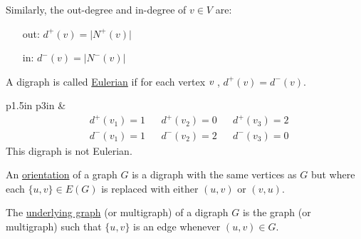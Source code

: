 \documentclass{book}
\newcommand{\exOne}{%
   \color{Purple}%
   \fontsize{14}{16}\selectfont%
}
\newenvironment{myIndent}{%
   \begin{adjustwidth}{2.5em}{0em}%
}{%
   \end{adjustwidth}%
}
\newcommand{\udefine}[1]{{%
   \setulcolor{Red}%
   \setul{0.14em}{0.07em}%
   \ul{#1}%
}}
\newcommand{\retTwo}{\hfill\bigbreak}
\begin{document}
Similarly, the out-degree and in-degree of $v \in V$ are:
\begin{myIndent}
   \begin{itemize}
      \item[{\color{BrickRed}out:}] $d^+(v)=\lvert N^+(v) \rvert$
      \item[{\color{BrickRed}\phantom{o}in:}] $d^-(v)=\lvert N^-(v) \rvert$
   \end{itemize}
\end{myIndent} \retTwo

A digraph is called \udefine{Eulerian} if for each vertex $v \hspace{0.25em}$, $d^+(v)=d^-(v)$.
{\center \exOne
   \begin{tabular}{ p{1.5in} p{3in} }
      &
      \[{\begin{matrix}
         & d^+(v_1) = 1 & & d^+(v_2) = 0 & & d^+(v_3) = 2 \\
         & d^-(v_1) = 1 & & d^-(v_2) = 2 & & d^-(v_3) = 0
      \end{matrix}}\]
      This digraph is not Eulerian.
   \end{tabular}
\par} \retTwo

An \udefine{orientation} of a graph $G$ is a digraph with the same vertices as $G$ but where each $\{u, v\} \in E(G)$ is replaced with either $(u, v)$ or $(v, u)$. \retTwo

The \udefine{underlying graph} (or multigraph) of a digraph $G$ is the graph (or multigraph) such that $\{u, v\}$ is an edge whenever $(u, v) \in G$.
\newpage
\end{document}
